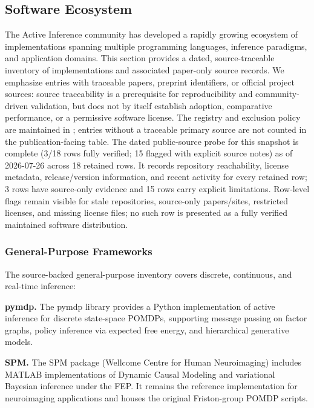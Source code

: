 \documentclass[
  english,
]{article}
\begin{document}
\subsection{Software Ecosystem}\label{software-ecosystem}

The Active Inference community has developed a rapidly growing ecosystem
of implementations spanning multiple programming languages, inference
paradigms, and application domains. This section provides a dated,
source-traceable inventory of implementations and associated paper-only
source records. We emphasize entries with traceable papers, preprint
identifiers, or official project sources: source traceability is a
prerequisite for reproducibility and community-driven validation, but
does not by itself establish adoption, comparative performance, or a
permissive software license. The registry and exclusion policy are
maintained in ; entries without a
traceable primary source are not counted in the publication-facing
table. The dated public-source probe for this snapshot is complete (3/18
rows fully verified; 15 flagged with explicit source notes) as of
2026-07-26 across 18 retained rows. It records repository reachability,
license metadata, release/version information, and recent activity for
every retained row; 3 rows have source-only evidence and 15 rows carry
explicit limitations. Row-level flags remain visible for stale
repositories, source-only papers/sites, restricted licenses, and missing
license files; no such row is presented as a fully verified maintained
software distribution.

\subsubsection{General-Purpose
Frameworks}\label{general-purpose-frameworks}

The source-backed general-purpose inventory covers discrete, continuous,
and real-time inference:

\textbf{pymdp.} The pymdp library \citep{heins2022pymdp} provides a
Python implementation of active inference for discrete state-space
POMDPs, supporting message passing on factor graphs, policy inference
via expected free energy, and hierarchical generative models.

\textbf{SPM.} The SPM package (Wellcome Centre for Human Neuroimaging)
includes MATLAB implementations of Dynamic Causal Modeling and
variational Bayesian inference under the FEP. It remains the reference
implementation for neuroimaging applications and houses the original
Friston-group POMDP scripts.
\end{document}
